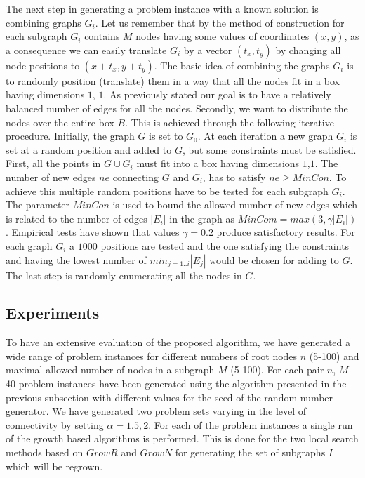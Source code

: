 The next step in generating a problem instance with a known solution is combining graphs $G_i$. Let us remember that by the method of construction for each subgraph $G_i$ contains $M$ nodes having some values of coordinates $(x, y)$, as a consequence we can easily translate $G_i$ by a vector $(t_x, t_y)$ by changing all node positions to $(x+t_x, y+t_y)$. The basic idea of combining the graphs $G_i$ is to randomly position (translate) them in a way that all the nodes fit in a box having dimensions $1$, $1$. As previously stated our goal is to have a relatively balanced number of edges for all the nodes. Secondly, we want to distribute the nodes over the entire box $B$.  This is achieved through the following iterative procedure. Initially, the graph $G$ is set to  $G_0$. At each iteration a new graph $G_i$ is set at a random position and added to $G$, but some constraints must be satisfied. First, all the points in $G \cup G_i$ must fit into a box having dimensions $1$,$1$. The number of new edges $ne$ connecting $G$ and $G_i$, has to satisfy $ne \geq  MinCon$.  To achieve this multiple random positions  have to be tested for each subgraph $G_i$. The parameter $MinCon$  is used to bound the allowed number of new edges which is related to the number of edges $|E_i|$ in the graph as $MinCom = max(3, \gamma |E_i|)$. Empirical tests have shown that values $\gamma = 0.2$ produce satisfactory results. For each  graph $G_i$ a $1000$ positions are tested and the one satisfying the constraints and having the lowest number of $min_{j= 1..i} |E_j|$ would be chosen for adding to $G$. The last step is randomly enumerating all the nodes in $G$. 

\subsection{Experiments}




To have an extensive evaluation of the proposed algorithm, we have generated a wide range of problem instances for different numbers of root nodes $n$ (5-100) and maximal allowed number of nodes in a subgraph $M$ (5-100). For each pair $n$, $M$ 40 problem instances have been generated using the algorithm presented in the previous subsection with different values for the seed of the random number generator. We have generated two problem sets varying in the level of connectivity by setting $\alpha = 1.5, 2$.  For each of the problem instances a single run of the growth based algorithms is performed. This is done for the two local search methods based on $GrowR$ and $GrowN$ for generating the set of subgraphs $I$ which will be regrown. 


